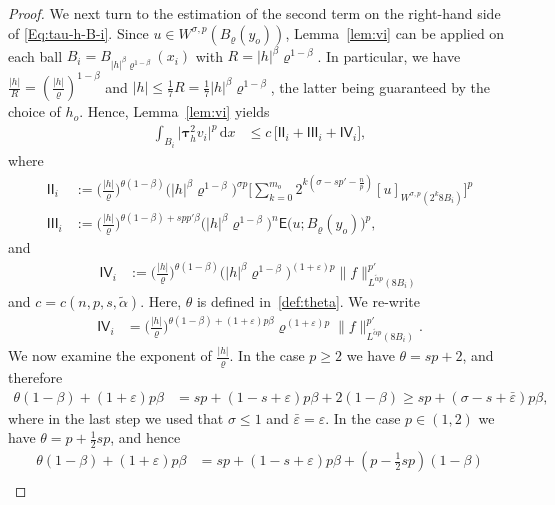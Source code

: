 \documentclass[10pt,letterpaper]{amsart}
\theoremstyle{definition}
\numberwithin{theorem}{section}
\numberwithin{equation}{section}
\newcommand{\1}{\ensuremath{\mathds{1}}}
\newcommand{\dx}{\mathrm{d}x}
\newcommand\sfE{{\boldsymbol{\mathsf E}}}
\newcommand\sfI{{\boldsymbol{\mathsf I}}}
\newcommand\sfV{{\boldsymbol{\mathsf V}}}
\renewcommand{\epsilon}{\varepsilon}
\renewcommand{\rho}{\varrho}
\renewcommand{\epsilon}{\varepsilon}
\renewcommand{\rho}{\varrho}
\numberwithin{equation}{section}
\begin{document}
\begin{proof}
We next turn to the estimation of the second term on the right-hand side of \eqref{Eq:tau-h-B-i}. Since \(u\in W^{\sigma,p}(B_\rho(y_o))\), Lemma~\ref{lem:vi} can be applied
on each ball \(B_i=B_{|h|^\beta\rho^{1-\beta}}(x_i)\) with \(R=|h|^\beta\rho^{1-\beta}\).
In particular, we have \(\frac{|h|}{R}=(\frac{|h|}{\rho})^{1-\beta}\) and
\(|h|\le \tfrac17 R = \tfrac17 |h|^\beta\rho^{1-\beta}\), the latter being guaranteed by
the choice of \(h_o\).
Hence, Lemma~\ref{lem:vi} yields
\begin{align*}
    \int_{B_i} \big|\boldsymbol
    \tau_h^2 v_i\big|^p \,\dx
    &\le
    c\, \big[ \sfI\sfI_i + \sfI\sfI\sfI_i + \sfI\sfV_i \big],
\end{align*}
where
\begin{align*}
    \sfI\sfI_i
    &:=
    \Big(\frac{|h|}{\rho}\Big)^{\theta(1-\beta)} \big(|h|^\beta\rho^{1-\beta}\big)^{\sigma p}
    \Bigg[
        \sum_{k=0}^{m_o}
        2^{k(\sigma-sp' - \frac{n}{p})}
        [u]_{W^{\sigma,p}(2^k 8B_i)}
    \Bigg]^p\\
    \sfI\sfI\sfI_i
    &:=
    \Big(\frac{|h|}{\rho}\Big)^{\theta(1-\beta)+spp'\beta} \big(|h|^{\beta}\rho^{1-\beta}\big)^n
    \sfE\big(u;B_\rho(y_o)\big)^p,
\end{align*}
and
\begin{align*}
     \sfI\sfV_i
    &:=
    \Big(\frac{|h|}{\rho}\Big)^{\theta(1-\beta)} \big(|h|^{\beta}\rho^{1-\beta}\big)^{(1+\epsilon)p}
    \|f\|_{L^{\tilde\alpha p}(8B_i)}^{p'}
\end{align*}
and $c=c(n,p,s,\tilde\alpha)$. 
Here, $\theta$ is defined in~\eqref{def:theta}.
We re-write
\begin{align*}
    \sfI\sfV_i
    &=
    \Big(\frac{|h|}{\rho}\Big)^{\theta(1-\beta)+(1+\epsilon)p\beta} 
    \rho^{(1+\epsilon)p}
    \|f\|_{L^{\tilde\alpha p}(8B_i)}^{p'}  .
\end{align*}
We now examine the exponent of $\frac{|h|}{\rho}$. In the case $p\ge2$ we have
$\theta = sp+2$, and therefore
\begin{align*}
    \theta(1-\beta)+(1+\epsilon)p\beta
    &=
    sp + (1-s+\epsilon)p\beta + 2(1-\beta)\ge 
    sp + (\sigma-s+\bar\epsilon)p\beta,
\end{align*}
where in the last step we used that $\sigma\le 1$ and $\bar\varepsilon =\varepsilon$.
In the case $p\in(1,2)$ we have $\theta = p+\tfrac12 sp$, and hence
\begin{align*}
    \theta(1-\beta)+(1+\epsilon)p\beta
    &=
    sp + (1-s+\epsilon)p\beta + (p-\tfrac12 sp)(1-\beta) \\

\end{align*}
\end{proof}
\end{document}
